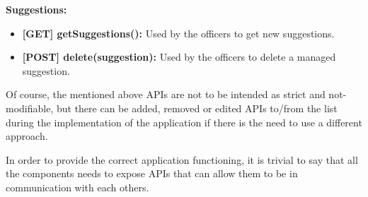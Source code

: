 \textbf{Suggestions:}
\begin{itemize}
	\item \textbf{[GET] getSuggestions():} Used by the officers to get new suggestions.
	\item \textbf{[POST] delete(suggestion):} Used by the officers to delete a managed suggestion.
\end{itemize}

Of course, the mentioned above APIs are not to be intended as strict and not-modifiable, but there can be added, removed or edited APIs to/from the list during the implementation of the application if there is the need to use a different approach.

In order to provide the correct application functioning, it is trivial to say that all the components needs to expose APIs that can allow them to be in communication with each others.

\begin{center}
	\begin{figure}[htp] 
		\label{fig:components} 
	\end{figure} 
\end{center}
